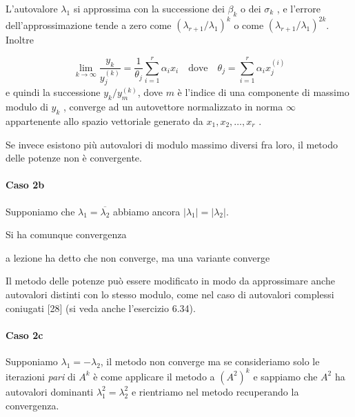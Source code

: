 L'autovalore $\lambda_1$ si approssima con la successione dei
$\beta_k$ o dei $\sigma_k$ , e l'errore dell'approssimazione tende a zero come
$(\lambda_{r+1} / \lambda_1 )^k$ o come $(\lambda_{r+1}/\lambda_1)^{2k}$. 
Inoltre

$$
\lim_{k \to \infty} \dfrac{y_k}{y_j^{(k)}} =
\dfrac{1}{\theta_j} \displaystyle \sum_{i=1}^{r} \alpha_i x_i
\quad
\text{dove}
\quad
\theta_j = \displaystyle \sum_{i=1}^{r} \alpha_i x_j^{(i)}
$$
e quindi la successione ${y_k /y_m^{(k)} }$, dove $m$ \`e l'indice di
una componente di massimo modulo di $y_k$ , converge ad un autovettore
normalizzato in norma $\infty$ appartenente allo spazio vettoriale
generato da $x_1 , x_2 , \ldots , x_r$ .

Se invece esistono pi\`u autovalori di modulo massimo diversi fra loro, il
metodo delle potenze non \`e convergente.

\paragraph{Caso 2b}
Supponiamo che $\lambda_1 = \overline{\lambda_2}$ abbiamo ancora
$|\lambda_1| = |\lambda_2|$.

Si ha comunque convergenza

\begin{notes}
a lezione ha detto che non converge, ma una variante converge\\
\end{notes}

\begin{notes}
  Il metodo delle potenze può essere modificato in modo da approssimare
  anche autovalori distinti con lo stesso modulo, come nel caso di
  autovalori complessi coniugati [28] (si veda anche l’esercizio
  6.34).
\end{notes}

\paragraph{Caso 2c}
Supponiamo $\lambda_1 = - \lambda_2$, il metodo non converge ma se
consideriamo solo le iterazioni \emph{pari} di $A^k$ è come applicare
il metodo a $(A^2)^k$ e sappiamo che $A^2$ ha autovalori dominanti
$\lambda_1^{2} = \lambda_2^{2}$ e rientriamo nel metodo recuperando la
convergenza.

